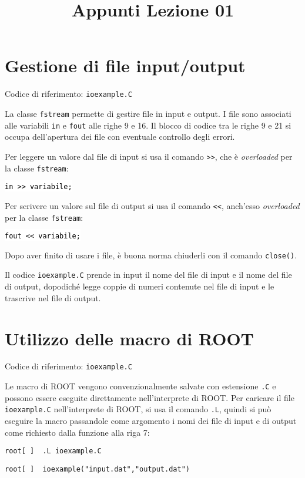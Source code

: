 \documentclass{article}
\title{Appunti Lezione 01}
\date{}
\newcommand{\ttt}{\texttt}
\newcommand{\tcpp}[1]{\hspace{10pt}\colorbox{background}{\textcolor{black}{\texttt{#1}}}}
\newcommand{\troot}[1]{\hspace{10pt}\colorbox{bashbackground}{\textcolor{bashtext}{\texttt{root[~]~~#1}}}}
\begin{document}
\maketitle
\section{Gestione di file input/output}
Codice di riferimento: \ttt{ioexample.C} \vspace{10pt}

La classe \ttt{fstream} permette di gestire file in input e output. I file sono associati alle variabili \ttt{in} e \ttt{fout} alle righe 9 e 16.
Il blocco di codice tra le righe 9 e 21 si occupa dell'apertura dei file con eventuale controllo degli errori.

Per leggere un valore dal file di input si usa il comando \ttt{>>}, che è \textit{overloaded} per la classe \ttt{fstream}:

\tcpp{in >> variabile;}

Per scrivere un valore sul file di output si usa il comando \ttt{<<}, anch'esso \textit{overloaded} per la classe \ttt{fstream}:

\tcpp{fout << variabile;}

Dopo aver finito di usare i file, è buona norma chiuderli con il comando \ttt{close()}.
\vspace{5pt}

Il codice \ttt{ioexample.C} prende in input il nome del file di input e il nome del file di output, dopodiché legge coppie di numeri contenute nel file di input e le trascrive nel file di output.

\section{Utilizzo delle macro di ROOT}
Codice di riferimento: \ttt{ioexample.C} \vspace{10pt}

Le macro di ROOT vengono convenzionalmente salvate con estensione \ttt{.C} e possono essere eseguite direttamente nell'interprete di ROOT. Per caricare il file \ttt{ioexample.C} nell'interprete di ROOT, si usa il comando \ttt{.L}, quindi si può eseguire la macro passandole come argomento i nomi dei file di input e di output come richiesto dalla funzione alla riga 7:
\vspace{5pt}

\troot{.L ioexample.C}

\troot{ioexample("input.dat","output.dat")}
\vspace{5pt}
\end{document}
